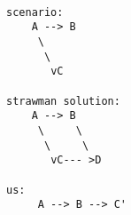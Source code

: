 \begin{figure}
\begin{small}
\begin{verbatim}

scenario:    
    A --> B   
     \	 
      \
       vC

strawman solution:
    A --> B
     \     \
      \     \
       vC--- >D

us:
     A --> B --> C'

\end{verbatim}
\end{small}
\caption{}
\label{f:sketch}
\end{figure}
